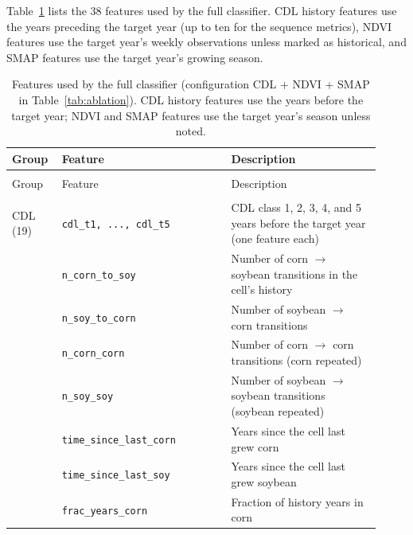 \documentclass[10pt,letterpaper]{article}
\begin{document}
Table~\ref{tab:features} lists the 38 features used by the full classifier. CDL history features use the years preceding the target year (up to ten for the sequence metrics), NDVI features use the target year's weekly observations unless marked as historical, and SMAP features use the target year's growing season.

{\footnotesize\setlength{\tabcolsep}{4pt}
\begin{longtable}{@{}>{\raggedright\arraybackslash}p{0.11\linewidth}>{\raggedright\arraybackslash}p{0.43\linewidth}>{\raggedright\arraybackslash}p{0.38\linewidth}@{}}
\caption{Features used by the full classifier (configuration CDL + NDVI + SMAP in Table~\ref{tab:ablation}). CDL history features use the years before the target year; NDVI and SMAP features use the target year's season unless noted.}\label{tab:features}\\
\toprule
Group & Feature & Description \\
\midrule
\endfirsthead
\multicolumn{3}{l}{\tablename\ \thetable\ continued}\\
\toprule
Group & Feature & Description \\
\midrule
\endhead
\midrule\multicolumn{3}{r}{Continued on next page}\\\endfoot
\bottomrule\endlastfoot

CDL (19) & \texttt{cdl\_t1, ..., cdl\_t5} & CDL class 1, 2, 3, 4, and 5 years before the target year (one feature each) \\

& \texttt{n\_corn\_to\_soy} & Number of corn $\to$ soybean transitions in the cell's history \\

& \texttt{n\_soy\_to\_corn} & Number of soybean $\to$ corn transitions \\

& \texttt{n\_corn\_corn} & Number of corn $\to$ corn transitions (corn repeated) \\

& \texttt{n\_soy\_soy} & Number of soybean $\to$ soybean transitions (soybean repeated) \\

& \texttt{time\_since\_last\_corn} & Years since the cell last grew corn \\

& \texttt{time\_since\_last\_soy} & Years since the cell last grew soybean \\

& \texttt{frac\_years\_corn} & Fraction of history years in corn \\


\end{longtable}}
\end{document}
